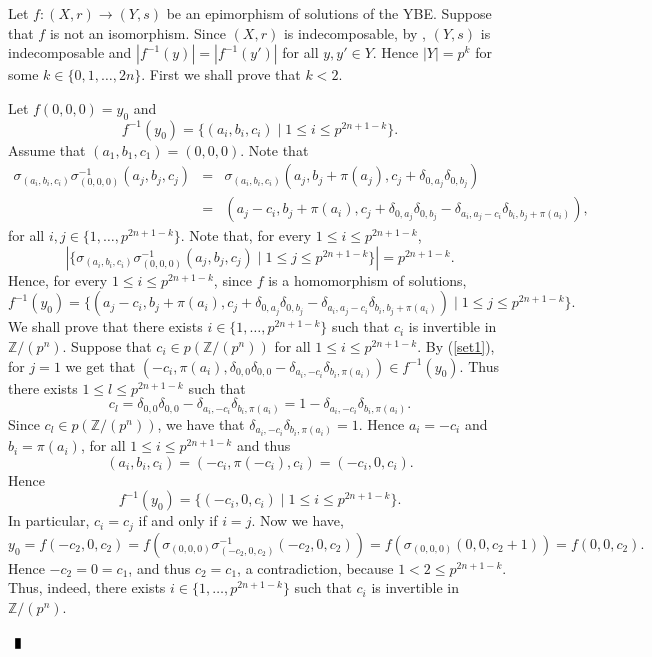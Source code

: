 \documentclass[10pt]{article}
\newcommand{\Z}{\mathbb{Z}}
\newenvironment{proof}{\par\noindent{ Proof.}}{$\qed$\par\bigskip}
\newcommand{\qed}{\enspace\vrule  height6pt  width4pt  depth2pt}
\begin{document}
\begin{proof}
Let $f\colon (X,r)\longrightarrow (Y,s)$ be an epimorphism of
solutions of the YBE. Suppose that $f$ is not an isomorphism.
Since $(X,r)$ is indecomposable, by \cite[Lemma 3.3]{CO23},
$(Y,s)$ is indecomposable and $|f^{-1}(y)|=|f^{-1}(y')|$ for all
$y,y'\in Y$. Hence $|Y|=p^{k}$ for some $k\in\{ 0,1,\dots ,2n\}$.
First we shall prove that $k<2$.

Let $f(0,0,0)=y_0$ and
$$f^{-1}(y_0)=\{ (a_i,b_i,c_i)\mid 1\leq i\leq p^{2n+1-k}\}.$$
Assume that $(a_1,b_1,c_1)=(0,0,0)$. Note that
\begin{eqnarray*}
    \sigma_{(a_i,b_i,c_i)}\sigma^{-1}_{(0,0,0)}(a_j,b_j,c_j)&=&\sigma_{(a_i,b_i,c_i)}(a_j,b_j+\pi(a_j),c_j+\delta_{0,a_j}\delta_{0,b_j})\\
    &=&(a_j-c_i,b_j+\pi(a_i),c_j+\delta_{0,a_j}\delta_{0,b_j}-\delta_{a_i,a_j-c_i}\delta_{b_i,b_j+\pi(a_i)}),
\end{eqnarray*}
for all $i,j\in\{ 1,\dots ,p^{2n+1-k}\}$. Note that, for every
$1\leq i\leq p^{2n+1-k}$,
$$|\{ \sigma_{(a_i,b_i,c_i)}\sigma^{-1}_{(0,0,0)}(a_j,b_j,c_j)\mid 1\leq j\leq p^{2n+1-k}\}|=p^{2n+1-k}.$$
Hence, for every $1\leq i\leq p^{2n+1-k}$, since $f$ is a
homomorphism of solutions,
\begin{equation}\label{set1}
    f^{-1}(y_0)=
    \{ (a_j-c_i,b_j+\pi(a_i),c_j+\delta_{0,a_j}\delta_{0,b_j}-\delta_{a_i,a_j-c_i}\delta_{b_i,b_j+\pi(a_i)})\mid 1\leq j\leq p^{2n+1-k}\}.
    \end{equation}
We shall prove that there exists $i\in\{ 1,\dots ,p^{2n+1-k}\}$
such that $c_i$ is invertible in $\Z/(p^n)$. Suppose that $c_i\in
p(\Z/(p^n))$ for all $1\leq i\leq p^{2n+1-k}$. By (\ref{set1}),
for $j=1$ we get that
$(-c_i,\pi(a_i),\delta_{0,0}\delta_{0,0}-\delta_{a_i,-c_i}\delta_{b_i,\pi(a_i)})\in
f^{-1}(y_0)$. Thus there exists $1\leq l\leq p^{2n+1-k}$ such that
$$c_l=\delta_{0,0}\delta_{0,0}-\delta_{a_i,-c_i}\delta_{b_i,\pi(a_i)}=
1-\delta_{a_i,-c_i}\delta_{b_i,\pi(a_i)}.$$ Since $c_l\in
p(\Z/(p^n))$, we have that
$\delta_{a_i,-c_i}\delta_{b_i,\pi(a_i)}=1$. Hence  $a_i=-c_i$ and
$b_i=\pi(a_i)$, for all $1\leq i\leq p^{2n+1-k}$ and thus
$$(a_i,b_i,c_i)=(-c_i,\pi(-c_i),c_i)=(-c_i,0,c_i).$$
Hence
$$f^{-1}(y_0)=\{ (-c_i,0,c_i)\mid 1\leq i\leq p^{2n+1-k}\}.$$
In particular, $c_i=c_j$ if and only if $i=j$. Now we have,
$$y_0=f(-c_2,0,c_2)=f(\sigma_{(0,0,0)}\sigma^{-1}_{(-c_2,0,c_2)}(-c_2,0,c_2))=
f(\sigma_{(0,0,0)}(0,0,c_2+1))=f(0,0,c_2).$$ Hence $-c_2=0=c_1$,
and thus $c_2=c_1$, a contradiction, because $1<2\leq p^{2n+1-k}$.
Thus, indeed, there exists $i\in\{ 1,\dots ,p^{2n+1-k}\}$ such
that $c_i$ is invertible in $\Z/(p^n)$.


\end{proof}
\end{document}
